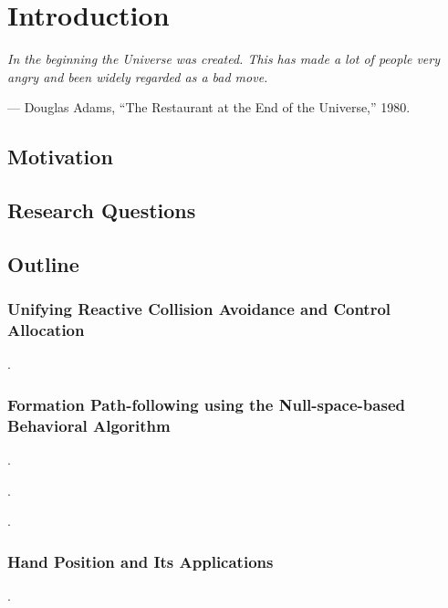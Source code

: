 \chapter{Introduction}
\label{chap:introduction}

\setlength{\epigraphwidth}{0.5\textwidth}
\epigraph{ \it
    In the beginning the Universe was created.
    This has made a lot of people very angry and been widely regarded as a bad move.
}{--- Douglas Adams, ``The Restaurant at the End of the Universe,'' 1980.}

\section{Motivation}



\section{Research Questions}

\section{Outline}

\subsection{Unifying Reactive Collision Avoidance and Control Allocation}
.

\subsection{Formation Path-following using the Null-space-based Behavioral Algorithm}
.

\noindent{}.

\noindent{}.

\subsection{Hand Position and Its Applications}
.

\noindent{}

\noindent{}

\noindent{}

\noindent{}
